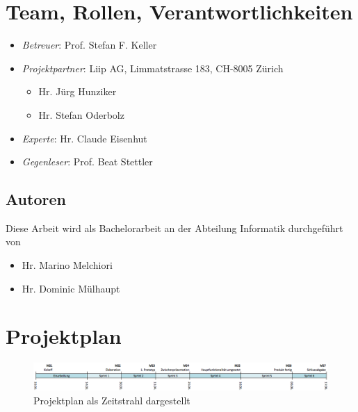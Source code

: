 \section{Team, Rollen, Verantwortlichkeiten}
\label{pm-rollen}
\begin{itemize}
	\item \textit{Betreuer}: Prof. Stefan F. Keller
	\item \textit{Projektpartner}: Liip AG, Limmatstrasse 183, CH-8005 Zürich
	\begin{itemize}
		\item Hr. Jürg Hunziker
		\item Hr. Stefan Oderbolz
	\end{itemize}
	\item \textit{Experte}: Hr. Claude Eisenhut
	\item \textit{Gegenleser}: Prof. Beat Stettler
\end{itemize}

\subsection*{Autoren}
Diese Arbeit wird als Bachelorarbeit an der Abteilung Informatik durchgeführt von
\begin{itemize}
	\item Hr. Marino Melchiori
	\item Hr. Dominic Mülhaupt
\end{itemize}




\section{Projektplan}

\begin{figure}[H]
	\centering
	\includegraphics[width=\textwidth]{images/projektmanagement/zeitstrahl.png}
	\caption{Projektplan als Zeitstrahl dargestellt}
	\label{image-project-plan-timeline}
\end{figure}

